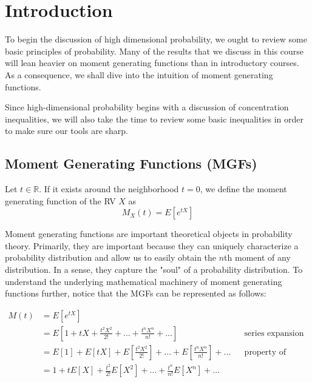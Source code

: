 

\section{Introduction}
To begin the discussion of high dimensional probability, we ought to review some basic principles of probability. Many of the results that we discuss in this course will lean heavier on moment generating functions than in introductory courses. As a consequence, we shall dive into the intuition of moment generating functions. 

Since high-dimensional probability begins with a discussion of concentration inequalities, we will also take the time to review some basic inequalities in order to make sure our tools are sharp. 
\subsection{Moment Generating Functions (MGFs)}
\begin{tcolorbox}
\begin{definition}
    Let $t \in \mathbb{R}.$ If it exists around the neighborhood $t=0$, we define the moment generating function of the RV $X$ as 
    \begin{equation}
    M_X(t) = E\left[e^{tX}\right] 
    \end{equation}
\end{definition}
\end{tcolorbox}


Moment generating functions are important theoretical objects in probability theory. Primarily, they are important because they can uniquely characterize a probability distribution and allow us to easily obtain the $n$th moment of any distribution. In a sense, they capture the "soul" of a probability distribution. To understand the underlying mathematical machinery of moment generating functions further, notice that the MGFs can be represented as follows:

\begin{align*}
    M(t) &= E[ e^{tX} ]     \\ 
    &= E\left[ 1 + tX + \frac{t^2 X^2}{2!} + ... + \frac{t^n X^n}{n!} + ...\right] && \text{series expansion}\\
    &= E\left[ 1 \right] + E\left[tX\right] + E\left[\frac{t^2 X^2}{2!}\right] + ... + E\left[\frac{t^n X^n}{n!}\right]+... &&\text{property of expectation} \\
    &= 1 + tE[X] + \frac{t^2}{2!}E[X^2] + ... + \frac{t^n}{n!} E[X^n] + ...
\end{align*}


